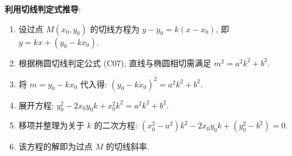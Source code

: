 \begin{proofbox}
\textbf{利用切线判定式推导}:
\begin{enumerate}
    \item 设过点 $M(x_0, y_0)$ 的切线方程为 $y - y_0 = k(x - x_0)$, 即 $y = kx + (y_0 - kx_0)$.
    \item 根据椭圆切线判定公式 (C07), 直线与椭圆相切需满足 $m^2 = a^2k^2 + b^2$.
    \item 将 $m = y_0 - kx_0$ 代入得: $(y_0 - kx_0)^2 = a^2k^2 + b^2$.
    \item 展开方程: $y_0^2 - 2x_0y_0k + x_0^2k^2 = a^2k^2 + b^2$.
    \item 移项并整理为关于 $k$ 的二次方程: $(x_0^2 - a^2)k^2 - 2x_0y_0k + (y_0^2 - b^2) = 0$.
    \item 该方程的解即为过点 $M$ 的切线斜率.
\end{enumerate}
\end{proofbox}
